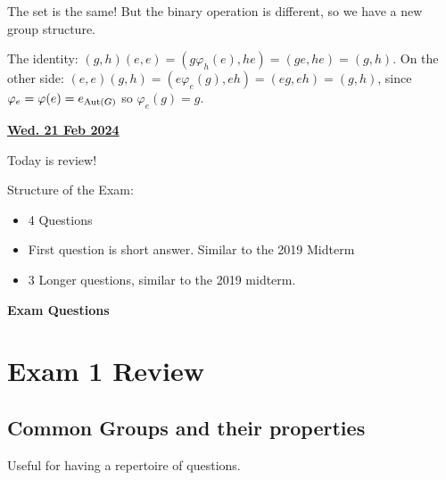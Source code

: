 \documentclass[12pt]{article}
\renewcommand{\date}[1]{\underline{\bf #1}}
\begin{document}
The set is the same! But the binary operation is different, so we have a new
group structure.

The identity: $(g, h)(e, e) = (g \varphi_h(e), he) = (ge, he) = (g, h)$.
On the other side: $(e, e)(g, h) = (e \varphi_e(g), eh) = (eg, eh) = (g, h)$,
since $\varphi_e = \varphi(e) = e_{\mathrm{Aut}(G)}$ so $\varphi_e(g) = g$.



\date{Wed. 21 Feb 2024}

Today is review!

Structure of the Exam:
\begin{itemize}
  \item 4 Questions
  \item First question is short answer. Similar to the 2019 Midterm
  \item 3 Longer questions, similar to the 2019 midterm.
\end{itemize}

{\bf Exam Questions}

\section{Exam 1 Review}

\subsection{Common Groups and their properties}

Useful for having a repertoire of questions.
\end{document}
